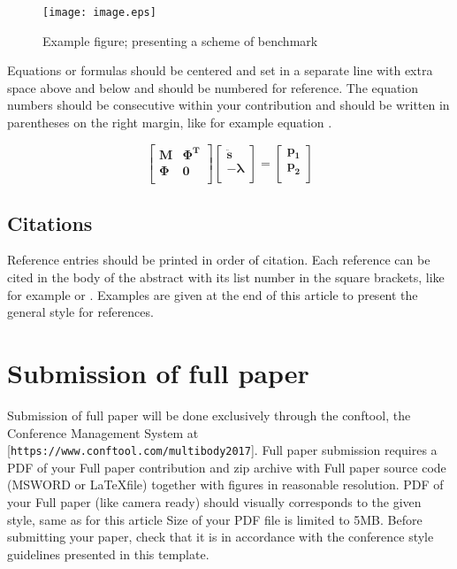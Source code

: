 \documentclass{mbd_fullpaper}
\begin{document}
\begin{figure}[ht]
  \begin{center}
    \texttt{[image: image.eps]}
    \caption{Example figure; presenting a scheme of benchmark \cite{Author2016}}
    \label{fig:fig1}
  \end{center}
\end{figure}


Equations or formulas should be centered and set in a separate line with extra space above and below and should be numbered for reference. The equation numbers should be consecutive within your contribution and should be written in parentheses on the right margin, like for example equation .

\begin{equation}
  \left [
  \begin{array}{cc}
    \boldsymbol{M}& \boldsymbol{\Phi^T}\\
    \boldsymbol{\Phi}& \boldsymbol{0}\\
  \end{array}
  \right ]
  \left [
  \begin{array}{c}
    \bm{\ddot s}\\
    -\boldsymbol{\lambda}\\
  \end{array}
  \right ]
  =
  \left [
  \begin{array}{c}
    \boldsymbol{p_1}\\
    \boldsymbol{p_2}\\
  \end{array}
  \right ]
  \label{eqn1}
\end{equation}


\subsection{Citations}

Reference entries should be printed in order of citation. Each reference can be cited in the body of the abstract with its list number in the square brackets, like for example \cite{Schiehlen1997} or \cite{Author2016}. Examples are given at the end of this article to present the general style for references.

\section{Submission of full paper}

Submission of full paper will be done exclusively through the conftool, the Conference Management System at [\texttt{https://www.conftool.com/multibody2017}]. Full paper submission requires a PDF of your Full paper contribution and zip archive with Full paper source code (MSWORD or \LaTeX file) together with figures in reasonable resolution. PDF of your Full paper (like camera ready) should visually corresponds to the given style, same as for this article Size of your PDF file is limited to 5MB. Before submitting your paper, check that it is in accordance with the conference style guidelines presented in this template.
\end{document}
